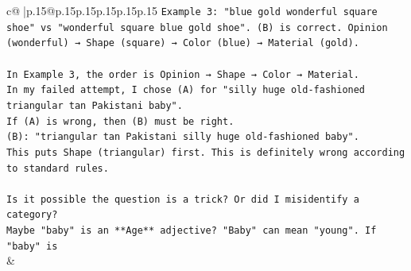 \documentclass{article}
\begin{document}
{\begin{supertabular}{c@{$\;$}|p{.15\linewidth}@{}p{.15\linewidth}p{.15\linewidth}p{.15\linewidth}p{.15\linewidth}p{.15\linewidth}}
{{{\texttt{Example 3: "blue gold wonderful square shoe" vs "wonderful square blue gold shoe". (B) is correct. Opinion (wonderful) → Shape (square) → Color (blue) → Material (gold).} \\
\\ 
\texttt{In Example 3, the order is Opinion → Shape → Color → Material.} \\
\texttt{In my failed attempt, I chose (A) for "silly huge old{-}fashioned triangular tan Pakistani baby".} \\
\texttt{If (A) is wrong, then (B) must be right.} \\
\texttt{(B): "triangular tan Pakistani silly huge old{-}fashioned baby".} \\
\texttt{This puts Shape (triangular) first. This is definitely wrong according to standard rules.} \\
\\ 
\texttt{Is it possible the question is a trick? Or did I misidentify a category?} \\
\texttt{Maybe "baby" is an **Age** adjective? "Baby" can mean "young". If "baby" is} \\
            }
        }
    }
    & \\ \\

\end{supertabular}
}
\end{document}

